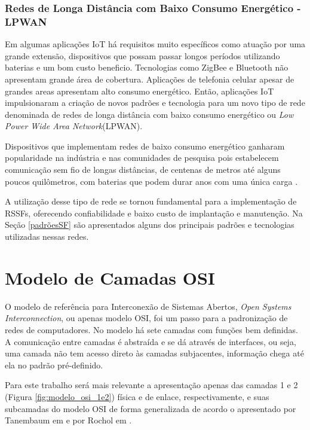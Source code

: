 \subsubsection*{Redes de Longa Distância com Baixo Consumo Energético - LPWAN}
Em algumas aplicações IoT há requisitos muito específicos como atuação por uma grande extensão, dispositivos que possam passar longos períodos utilizando baterias e um bom custo beneficio. Tecnologias como ZigBee e Bluetooth não apresentam grande área de cobertura. Aplicações de telefonia celular apesar de grandes areas apresentam alto consumo energético.  Então, aplicações IoT impulsionaram a criação de novos padrões e tecnologia para um novo tipo de rede denominada de redes de longa distância com baixo consumo energético ou \emph{Low Power Wide Area Network}(LPWAN).

Dispositivos que implementam redes de baixo consumo energético ganharam popularidade na indústria e nas comunidades de pesquisa pois estabelecem comunicação sem fio de longas distâncias, de centenas de metros até alguns poucos quilômetros, com baterias que podem durar anos com uma única carga \cite{mekki2019comparative}.

A utilização desse tipo de rede se tornou fundamental para a implementação de RSSFs, oferecendo confiabilidade e baixo custo de implantação e manutenção. Na Seção \ref{padrõesSF} são apresentados alguns dos principais padrões e tecnologias utilizadas nessas redes.

\section{Modelo de Camadas OSI}
\label{osi}
O modelo de referência para Interconexão de Sistemas Abertos, \emph{Open Systems Interconnection}, ou apenas modelo OSI, foi um passo para a padronização de redes de computadores. No modelo há sete camadas com funções bem definidas. A comunicação entre camadas é abstraída e se dá através de interfaces, ou seja, uma camada não tem acesso direto às camadas subjacentes, informação chega até ela no padrão pré-definido.

Para este trabalho será mais relevante a apresentação apenas das camadas 1 e 2 (Figura \ref{fig:modelo_osi_1e2})  física e de enlace, respectivamente, e suas subcamadas do modelo OSI de forma generalizada de acordo o apresentado por Tanembaum em \cite{tanembaum2011} e por Rochol em \cite{rochol2018sistemas}.

